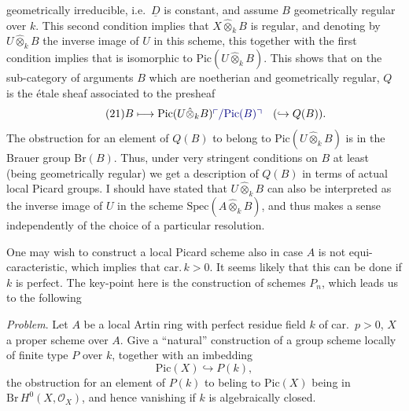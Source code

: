 \documentclass[11pt,a4paper]{article}
\begin{document}
geometrically irreducible, i.e.\ $\underline{D}$ is constant, and assume $B$
geometrically regular over $k$. This second condition implies that
$X \hat{\otimes}_k B$ is regular, and denoting by $U \hat{\otimes}_k B$ the
inverse image of $U$ in this scheme,  this
together with the first condition implies that
 is isomorphic to
$\mathrm{Pic}(U \hat{\otimes}_k B)$. This shows that on the sub-category of
arguments $B$ which are noetherian and geometrically regular, $Q$ is the étale
sheaf associated to the presheaf
\begin{equation*}
\tag{21} B \longmapsto \mathrm{Pic}(U \hat{\otimes}_k B)\text{\add{$/\mathrm{Pic}(B)$}} \quad (\hookrightarrow Q(B)) .
\end{equation*}
The obstruction for an element of $Q(B)$ to belong to
$\mathrm{Pic}(U \hat{\otimes}_k B)$ is in the Brauer
group $\mathrm{Br}(B)$. Thus, under very stringent conditions on $B$ at least
(being geometrically regular) we get a description of $Q(B)$ in terms of
actual local Picard groups. I should have stated that $U \hat{\otimes}_k B$
can also be interpreted as the inverse image of $U$ in the scheme
$\mathrm{Spec}(A \hat{\otimes}_k B)$, and thus makes a sense independently of
the choice of a particular resolution.

One may wish to construct a local Picard scheme  also in case
$A$ is not equi-caracteristic, which implies that $\mathrm{car}.\,k > 0$. It
seems likely that this can be done if $k$ is perfect. The key-point here is
the construction of schemes $P_n$, which leads us to the following

\emph{Problem}. Let $A$ be a local Artin ring with perfect residue field $k$
of car.~$p > 0$, $X$ a proper scheme over $A$. Give a ``natural''
construction of a group scheme locally of finite type $P$ over $k$, together
with an imbedding
\begin{equation*}
\tag{22} \mathrm{Pic}(X) \hookrightarrow P(k) ,
\end{equation*}
the obstruction for an element of $P(k)$ to beling to $\mathrm{Pic}(X)$
\add{(}being in $\mathrm{Br}\, H^0(X, \mathcal{O}_X)$, and hence\add{)}
vanishing if $k$ is algebraically closed.
\end{document}
